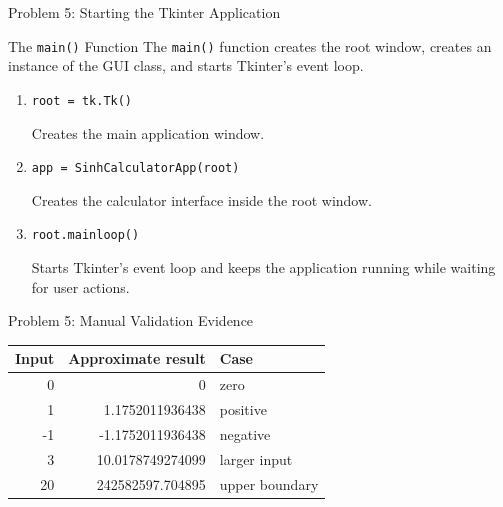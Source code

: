 \documentclass[aspectratio=169,11pt]{beamer}
\begin{document}
\begin{frame}[t]{Problem 5: Starting the Tkinter Application}
\small

\begin{block}{The \texttt{main()} Function}
The \texttt{main()} function creates the root window, creates an
instance of the GUI class, and starts Tkinter's event loop.
\end{block}

\begin{enumerate}

\item
\texttt{root = tk.Tk()}

Creates the main application window.

\vspace{0.25cm}

\item
\texttt{app = SinhCalculatorApp(root)}

Creates the calculator interface inside the root window.

\vspace{0.25cm}

\item
\texttt{root.mainloop()}

Starts Tkinter's event loop and keeps the application running while
waiting for user actions.

\end{enumerate}
\end{frame}

\begin{frame}{Problem 5: Manual Validation Evidence}
\centering
\begin{tabular}{r r l}
\toprule
\textbf{Input} & \textbf{Approximate result} & \textbf{Case} \\
\midrule
0 & 0 & zero \\
1 & 1.1752011936438 & positive \\
-1 & -1.1752011936438 & negative \\
3 & 10.0178749274099 & larger input \\
20 & 242582597.704895 & upper boundary \\
\bottomrule
\end{tabular}
\end{frame}

\end{document}
